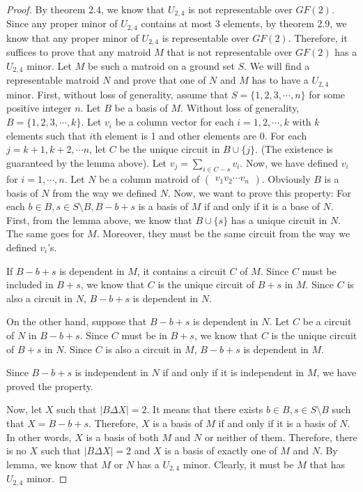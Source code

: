 \begin{proof}
By theorem 2.4, we know that $U_{2, 4}$ is not representable over $GF(2)$.
Since any proper minor of $U_{2, 4}$ contains at most 3 elements, by theorem 2.9, we know that any proper minor of $U_{2, 4}$ is representable over $GF(2)$.
Therefore, it suffices to prove that any matroid $M$ that is not representable over $GF(2)$ has a $U_{2, 4}$ minor.
Let $M$ be such a matroid on a ground set $S$.
We will find a representable matroid $N$ and prove that one of $N$ and $M$ has to have a $U_{2, 4}$ minor.
First, without loss of generality, assume that $S = \{1, 2, 3, \cdots, n\}$ for some positive integer $n$.
Let $B$ be a basis of $M$.
Without loss of generality, $B = \{1, 2, 3, \cdots, k\}$.
Let $v_i$ be a column vector for each $i = 1, 2, \cdots, k$ with $k$ elements such that $i$th element is 1 and other elements are 0.
For each $j = k + 1, k + 2, \cdots n$, let $C$ be the unique circuit in $B \cup \{ j \}$. 
(The existence is guaranteed by the lemma above).
Let $\displaystyle v_j = \sum_{i \in C - s } v_i$.
Now, we have defined $v_i$ for $i = 1, \cdots, n$.
Let $N$ be a column matroid of $\begin{pmatrix} v_1 v_2 \cdots v_n \end{pmatrix}$.
Obviously $B$ is a basis of $N$ from the way we defined $N$.
Now, we want to prove this property: For each $b \in B, s \in S \setminus B, B - b + s$ is a basis of $M$ if and only if it is a base of $N$.
First, from the lemma above, we know that $B \cup \{ s \}$ has a unique circuit in $N$.
The same goes for $M$.
Moreover, they must be the same circuit from the way we defined $v_i$'s.

If $B - b + s$ is dependent in $M$, it contains a circuit $C$ of $M$.
Since $C$ must be included in $B + s$, we know that $C$ is the unique circuit of $B + s$ in $M$.
Since $C$ is also a circuit in $N$, $B - b + s$ is dependent in $N$.

On the other hand, suppose that $B - b + s$ is dependent in $N$.
Let $C$ be a circuit of $N$ in $B - b + s$.
Since $C$ must be in $B + s$, we know that $C$ is the unique circuit of $B + s$ in $N$.
Since $C$ is also a circuit in $M$, $B - b + s$ is dependent in $M$.

Since $B - b + s$ is independent in $N$ if and only if it is independent in $M$, we have proved the property.

Now, let $X$ such that $\lvert B \Delta X \rvert = 2$.
It means that there exists $b \in B, s \in S \setminus B$ such that $X = B - b + s$.
Therefore, $X$ is a basis of $M$ if and only if it is a basis of $N$.
In other words, $X$ is a basis of both $M$ and $N$ or neither of them.
Therefore, there is no $X$ such that $\lvert B \Delta X \rvert = 2$ and $X$ is a basis of exactly one of $M$ and $N$.
By lemma, we know that $M$ or $N$ has a $U_{2, 4}$ minor.
Clearly, it must be $M$ that has $U_{2, 4}$ minor.
\end{proof}

